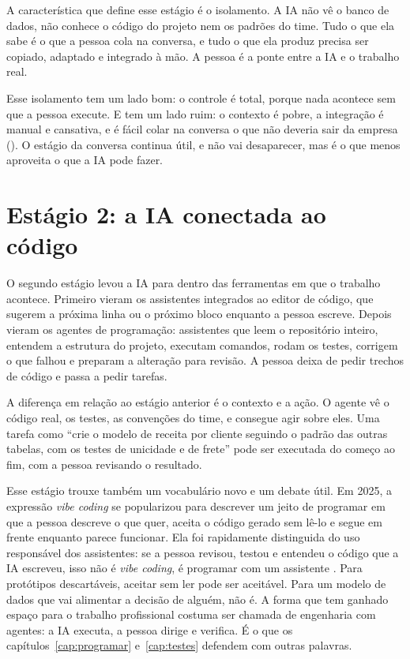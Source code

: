 A característica que define esse estágio é o isolamento. A IA não vê o banco de dados, não
conhece o código do projeto nem os padrões do time. Tudo o que ela sabe é o que a pessoa
cola na conversa, e tudo o que ela produz precisa ser copiado, adaptado e integrado à mão.
A pessoa é a ponte entre a IA e o trabalho real.

Esse isolamento tem um lado bom: o controle é total, porque nada acontece sem que a pessoa
execute. E tem um lado ruim: o contexto é pobre, a integração é manual e cansativa, e é fácil
colar na conversa o que não deveria sair da empresa (). O estágio da
conversa continua útil, e não vai desaparecer, mas é o que menos aproveita o que a IA pode
fazer.

\section{Estágio 2: a IA conectada ao código}
\label{sec:estagio-codigo}

O segundo estágio levou a IA para dentro das ferramentas em que o trabalho acontece. Primeiro
vieram os assistentes integrados ao editor de código, que sugerem a próxima linha ou o
próximo bloco enquanto a pessoa escreve. Depois vieram os agentes de programação: assistentes
que leem o repositório inteiro, entendem a estrutura do projeto, executam comandos, rodam os
testes, corrigem o que falhou e preparam a alteração para revisão. A pessoa deixa de pedir
trechos de código e passa a pedir tarefas.

A diferença em relação ao estágio anterior é o contexto e a ação. O agente vê o código real,
os testes, as convenções do time, e consegue agir sobre eles. Uma tarefa como \enquote{crie
o modelo de receita por cliente seguindo o padrão das outras tabelas, com os testes de
unicidade e de frete} pode ser executada do começo ao fim, com a pessoa revisando o resultado.

Esse estágio trouxe também um vocabulário novo e um debate útil. Em 2025, a expressão
\emph{vibe coding} se popularizou para descrever um jeito de programar em que a pessoa
descreve o que quer, aceita o código gerado sem lê-lo e segue em frente enquanto parece
funcionar. Ela foi rapidamente distinguida do uso responsável dos assistentes: se a pessoa
revisou, testou e entendeu o código que a IA escreveu, isso não é \emph{vibe coding}, é
programar com um assistente \parencite{willison2025}. Para protótipos descartáveis, aceitar
sem ler pode ser aceitável. Para um modelo de dados que vai alimentar a decisão de alguém,
não é. A forma que tem ganhado espaço para o trabalho profissional costuma ser chamada de
engenharia com agentes: a IA executa, a pessoa dirige e verifica. É o que os
capítulos~\ref{cap:programar} e~\ref{cap:testes} defendem com outras palavras.

